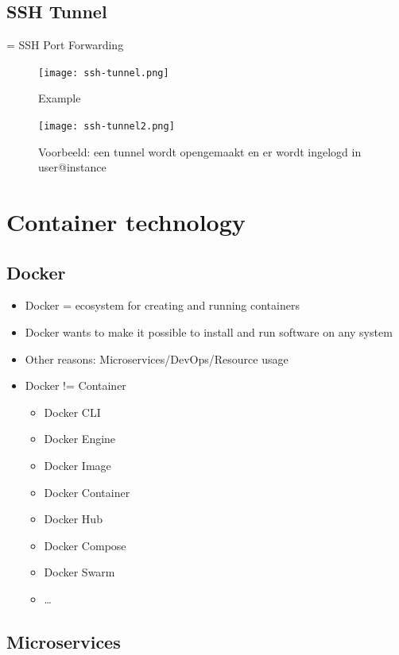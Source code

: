 \documentclass{article}
\begin{document}
\subsection{SSH Tunnel}

= SSH Port Forwarding

\begin{figure}[H]
    \centering
    \texttt{[image: ssh-tunnel.png]}
    \caption{Example}
\end{figure}

\begin{figure}[H]
    \centering
    \texttt{[image: ssh-tunnel2.png]}
    \caption{Voorbeeld: een tunnel wordt opengemaakt en er wordt ingelogd in user@instance}
\end{figure}


\section{Container technology}

\subsection{Docker}

\begin{itemize}
    \item Docker = ecosystem for creating and running containers
    \item Docker wants to make it possible to install and run software on any system
    \item Other reasons: Microservices/DevOps/Resource usage
    \item Docker != Container
    \begin{itemize}
        \item Docker CLI
        \item Docker Engine
        \item Docker Image
        \item Docker Container
        \item Docker Hub
        \item Docker Compose
        \item Docker Swarm
        \item \dots
    \end{itemize}
\end{itemize}

\subsection{Microservices}
\end{document}
